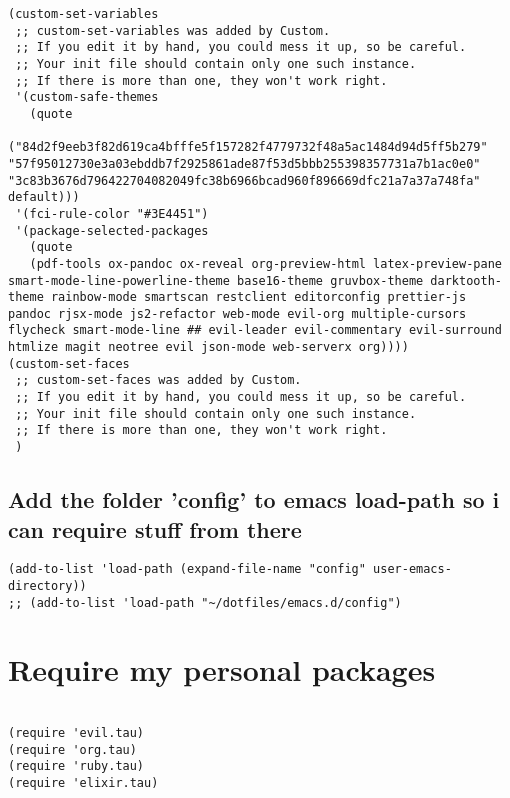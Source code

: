 \documentclass[11pt]{article}
\begin{document}
\begin{verbatim}
(custom-set-variables
 ;; custom-set-variables was added by Custom.
 ;; If you edit it by hand, you could mess it up, so be careful.
 ;; Your init file should contain only one such instance.
 ;; If there is more than one, they won't work right.
 '(custom-safe-themes
   (quote
    ("84d2f9eeb3f82d619ca4bfffe5f157282f4779732f48a5ac1484d94d5ff5b279" "57f95012730e3a03ebddb7f2925861ade87f53d5bbb255398357731a7b1ac0e0" "3c83b3676d796422704082049fc38b6966bcad960f896669dfc21a7a37a748fa" default)))
 '(fci-rule-color "#3E4451")
 '(package-selected-packages
   (quote
   (pdf-tools ox-pandoc ox-reveal org-preview-html latex-preview-pane smart-mode-line-powerline-theme base16-theme gruvbox-theme darktooth-theme rainbow-mode smartscan restclient editorconfig prettier-js pandoc rjsx-mode js2-refactor web-mode evil-org multiple-cursors flycheck smart-mode-line ## evil-leader evil-commentary evil-surround htmlize magit neotree evil json-mode web-serverx org))))
(custom-set-faces
 ;; custom-set-faces was added by Custom.
 ;; If you edit it by hand, you could mess it up, so be careful.
 ;; Your init file should contain only one such instance.
 ;; If there is more than one, they won't work right.
 )
\end{verbatim}

\subsection*{Add the folder 'config' to emacs load-path so i can require stuff from there}
\label{sec:orgdc05d3c}

\begin{verbatim}
(add-to-list 'load-path (expand-file-name "config" user-emacs-directory))
;; (add-to-list 'load-path "~/dotfiles/emacs.d/config")

\end{verbatim}









\section*{Require my personal packages}
\label{sec:org3a1be9f}
\begin{verbatim}

(require 'evil.tau)
(require 'org.tau)
(require 'ruby.tau)
(require 'elixir.tau)

\end{verbatim}
\end{document}
